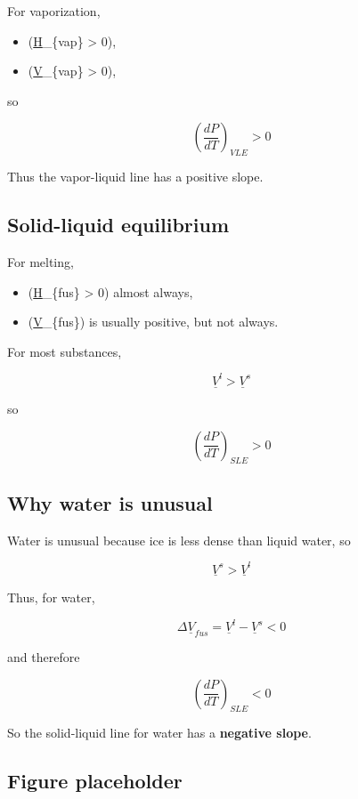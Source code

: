 \documentclass[
  letterpaper,
  DIV=11,
  numbers=noendperiod]{scrartcl}
\providecommand{\tightlist}{%
  \setlength{\itemsep}{0pt}\setlength{\parskip}{0pt}}
\begin{document}
For vaporization,

\begin{itemize}
\tightlist
\item
  (\Delta \underline{H}\_\{vap\} \textgreater{} 0),
\item
  (\Delta \underline{V}\_\{vap\} \textgreater{} 0),
\end{itemize}

so

\[
\left(\frac{dP}{dT}\right)_{VLE} > 0
\]

Thus the vapor-liquid line has a positive slope.

\subsection{Solid-liquid equilibrium}\label{solid-liquid-equilibrium}

For melting,

\begin{itemize}
\tightlist
\item
  (\Delta \underline{H}\_\{fus\} \textgreater{} 0) almost always,
\item
  (\Delta \underline{V}\_\{fus\}) is usually positive, but not always.
\end{itemize}

For most substances,

\[
\underline{V}^l > \underline{V}^s
\]

so

\[
\left(\frac{dP}{dT}\right)_{SLE} > 0
\]

\subsection{Why water is unusual}\label{why-water-is-unusual}

Water is unusual because ice is less dense than liquid water, so

\[
\underline{V}^s > \underline{V}^l
\]

Thus, for water,

\[
\Delta \underline{V}_{fus} = \underline{V}^l - \underline{V}^s < 0
\]

and therefore

\[
\left(\frac{dP}{dT}\right)_{SLE} < 0
\]

So the solid-liquid line for water has a \textbf{negative slope}.

\subsection{Figure placeholder}\label{figure-placeholder-1}
\end{document}
